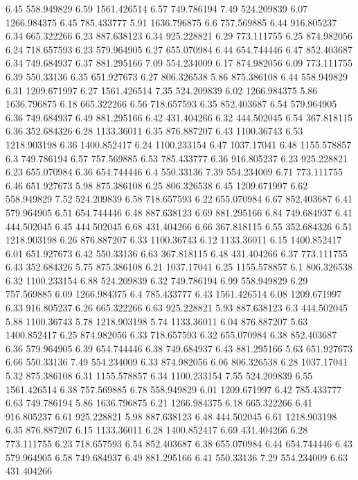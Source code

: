 6.45	558.949829
6.59	1561.426514
6.57	749.786194
7.49	524.209839
6.07	1266.984375
6.45	785.433777
5.91	1636.796875
6.6	757.569885
6.44	916.805237
6.34	665.322266
6.23	887.638123
6.34	925.228821
6.29	773.111755
6.25	874.982056
6.24	718.657593
6.23	579.964905
6.27	655.070984
6.44	654.744446
6.47	852.403687
6.34	749.684937
6.37	881.295166
7.09	554.234009
6.17	874.982056
6.09	773.111755
6.39	550.33136
6.35	651.927673
6.27	806.326538
5.86	875.386108
6.44	558.949829
6.31	1209.671997
6.27	1561.426514
7.35	524.209839
6.02	1266.984375
5.86	1636.796875
6.18	665.322266
6.56	718.657593
6.35	852.403687
6.54	579.964905
6.36	749.684937
6.49	881.295166
6.42	431.404266
6.32	444.502045
6.54	367.818115
6.36	352.684326
6.28	1133.36011
6.35	876.887207
6.43	1100.36743
6.53	1218.903198
6.36	1400.852417
6.24	1100.233154
6.47	1037.17041
6.48	1155.578857
6.3	749.786194
6.57	757.569885
6.53	785.433777
6.36	916.805237
6.23	925.228821
6.23	655.070984
6.36	654.744446
6.4	550.33136
7.39	554.234009
6.71	773.111755
6.46	651.927673
5.98	875.386108
6.25	806.326538
6.45	1209.671997
6.62	558.949829
7.52	524.209839
6.58	718.657593
6.22	655.070984
6.67	852.403687
6.41	579.964905
6.51	654.744446
6.48	887.638123
6.69	881.295166
6.84	749.684937
6.41	444.502045
6.45	444.502045
6.68	431.404266
6.66	367.818115
6.55	352.684326
6.51	1218.903198
6.26	876.887207
6.33	1100.36743
6.12	1133.36011
6.15	1400.852417
6.01	651.927673
6.42	550.33136
6.63	367.818115
6.48	431.404266
6.37	773.111755
6.43	352.684326
5.75	875.386108
6.21	1037.17041
6.25	1155.578857
6.1	806.326538
6.32	1100.233154
6.88	524.209839
6.32	749.786194
6.99	558.949829
6.29	757.569885
6.09	1266.984375
6.4	785.433777
6.43	1561.426514
6.08	1209.671997
6.33	916.805237
6.26	665.322266
6.63	925.228821
5.93	887.638123
6.3	444.502045
5.88	1100.36743
5.78	1218.903198
5.74	1133.36011
6.04	876.887207
5.63	1400.852417
6.25	874.982056
6.33	718.657593
6.32	655.070984
6.38	852.403687
6.36	579.964905
6.39	654.744446
6.38	749.684937
6.43	881.295166
5.63	651.927673
6.66	550.33136
7.49	554.234009
6.33	874.982056
6.06	806.326538
6.28	1037.17041
5.32	875.386108
6.31	1155.578857
6.34	1100.233154
7.55	524.209839
6.55	1561.426514
6.38	757.569885
6.78	558.949829
6.01	1209.671997
6.42	785.433777
6.63	749.786194
5.86	1636.796875
6.21	1266.984375
6.18	665.322266
6.41	916.805237
6.61	925.228821
5.98	887.638123
6.48	444.502045
6.61	1218.903198
6.35	876.887207
6.15	1133.36011
6.28	1400.852417
6.69	431.404266
6.28	773.111755
6.23	718.657593
6.54	852.403687
6.38	655.070984
6.44	654.744446
6.43	579.964905
6.58	749.684937
6.49	881.295166
6.41	550.33136
7.29	554.234009
6.63	431.404266
